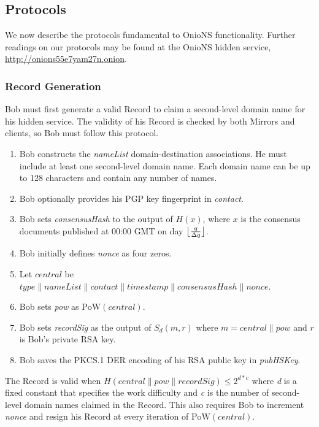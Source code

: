 \documentclass{sig-alternate}
\DeclarePairedDelimiter{\floor}{\lfloor}{\rfloor}
\newcommand*\concat{\mathbin{\|}}
\begin{document}
\newpage

\subsection{Protocols} %

We now describe the protocols fundamental to OnioNS functionality. Further readings on our protocols may be found at the OnioNS hidden service, \url{http://onions55e7yam27n.onion}.

\subsubsection{Record Generation} %

Bob must first generate a valid Record to claim a second-level domain name for his hidden service. The validity of his Record is checked by both Mirrors and clients, so Bob must follow this protocol.

\begin{enumerate}[noitemsep]
	\item Bob constructs the \emph{nameList} domain-destination associations. He must include at least one second-level domain name. Each domain name can be up to 128 characters and contain any number of names.
	\item Bob optionally provides his PGP key fingerprint in \emph{contact}.
	\item Bob sets \emph{consensusHash} to the output of $ H(x) $, where $ x $ is the consensus documents published at 00:00 GMT on day $ \floor[\big]{\frac{q}{\Delta q}} $.
	\item Bob initially defines \emph{nonce} as four zeros.
	\item Let $ \mathit{central} $ be $\mathit{type} \concat \mathit{nameList} \concat \mathit{contact} \concat \mathit{timestamp} \concat \mathit{consensusHash} \concat \mathit{nonce} $.
	\item Bob sets \emph{pow} as $ \mathrm{PoW}(\mathit{central}) $.
	\item Bob sets \emph{recordSig} as the output of $ S_{d}(m, r) $ where $ m = \mathit{central} \concat \mathit{pow} $ and $ r $ is Bob's private RSA key.
	\item Bob saves the PKCS.1 DER encoding of his RSA public key in \emph{pubHSKey}.
\end{enumerate}

The Record is valid when $ H(\mathit{central} \concat \mathit{pow} \concat \mathit{recordSig}) \leq 2^{\mathit{d} * \mathit{c}} $ where \emph{d} is a fixed constant that specifies the work difficulty and \emph{c} is the number of second-level domain names claimed in the Record. This also requires Bob to increment \emph{nonce} and resign his Record at every iteration of $ \mathrm{PoW}(\mathit{central}) $.
\end{document}
